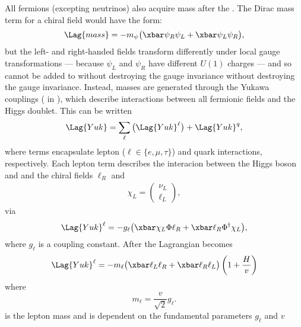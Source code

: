 All fermions (excepting neutrinos) also acquire mass after the \SSB.
The Dirac mass term for a chiral field would have the form:
\begin{equation}
  \Lag{mass} = -m_\psi\big(\xbar\psi_R\psi_L + \xbar\psi_L\psi_R\big),
\end{equation}
but the left- and right-handed fields
transform differently under local gauge transformations
--- because $\psi_L$ and $\psi_R$ have different $U(1)$ charges ---
and so cannot be added to  without destroying the gauge invariance without destroying the
gauge invariance.
Instead, masses are generated through the Yukawa couplings ( in ), which
describe interactions between all fermionic fields and the Higgs doublet.
This can be written
\begin{equation}
  \Lag{Yuk} = \sum_{\ell}\big(\Lag{Yuk}^\ell\big) + \Lag{Yuk}^q,
  \label{eq:th:yukking}
\end{equation}
where terms encapsulate lepton ($\ell\in\{e,\mu,\tau\}$) and quark interactions, respectively.
Each lepton term describes the interacion between the Higgs boson and and the chiral fields
$\ell_R$ and
\begin{align}
  \chi_L = \begin{pmatrix}\nu_L \\ \ell_L \end{pmatrix},
\end{align}
via
\begin{equation}
  \Lag{Yuk}^\ell
  = - g_\ell\big(\xbar\chi_L\Phi \ell_R + \xbar \ell_R\Phi^\dagger\chi_L\big),
\end{equation}
where $g_\ell$ is a coupling constant.
After \SSB the Lagrangian becomes
\begin{align}
  \Lag{Yuk}^\ell
  = - m_\ell \big(\xbar\ell_L\ell_R + \xbar\ell_R\ell_L\big)%
  \left(1 + \frac{H}{v}\right)
\end{align}
where
\begin{equation}
  m_\ell = \frac{v}{\sqrt{2}}g_\ell.
  \label{eq:leptonmass}
\end{equation}
is the lepton mass and is dependent on the fundamental \sm parameters $g_\ell$ and $v$

